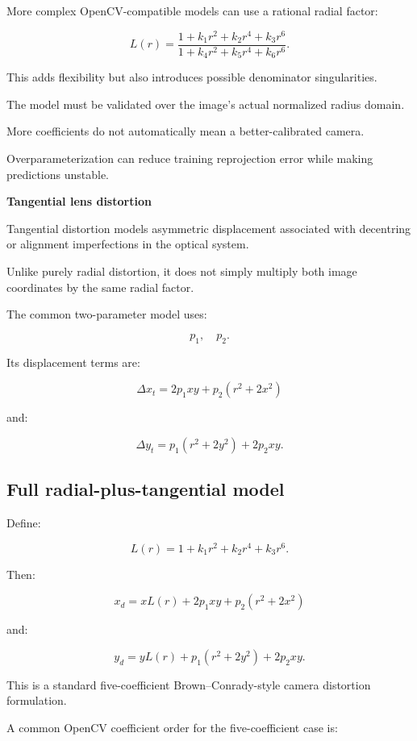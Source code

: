 More complex OpenCV-compatible models can use a rational radial factor:

\[
 \boxed{ L(r)= \frac{ 1+k_1r^2+k_2r^4+k_3r^6 }{ 1+k_4r^2+k_5r^4+k_6r^6 } }.
\]

This adds flexibility but also introduces possible denominator singularities.

The model must be validated over the image's actual normalized radius domain.

More coefficients do not automatically mean a better-calibrated camera.

Overparameterization can reduce training reprojection error while making predictions unstable.

\textbf{Tangential lens distortion}

Tangential distortion models asymmetric displacement associated with decentring or alignment imperfections in the optical system.

Unlike purely radial distortion, it does not simply multiply both image coordinates by the same radial factor.

The common two-parameter model uses:

\[
 p_1,\quad p_2.
\]

Its displacement terms are:

\[
 \boxed{ \Delta x_t= 2p_1xy+p_2(r^2+2x^2) }
\]

and:

\[
 \boxed{ \Delta y_t= p_1(r^2+2y^2)+2p_2xy }.
\]

\subsection{Full radial-plus-tangential model}\label{02-foundations-ii-ch035-full-radial-plus-tangential-model}

\hypertarget{02-foundations-ii-ch035-full-radial-plus-tangential-model}{}

Define:

\[
 L(r)=1+k_1r^2+k_2r^4+k_3r^6.
\]

Then:

\[
 \boxed{ x_d= xL(r)+2p_1xy+p_2(r^2+2x^2) }
\]

and:

\[
 \boxed{ y_d= yL(r)+p_1(r^2+2y^2)+2p_2xy }.
\]

This is a standard five-coefficient Brown--Conrady-style camera distortion formulation.

A common OpenCV coefficient order for the five-coefficient case is:

